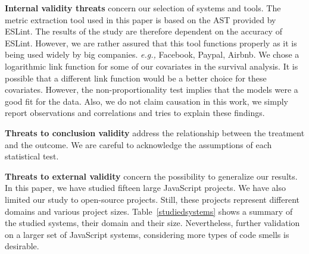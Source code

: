 \documentclass[smallcondensed]{svjour3}
\newcommand{\eg}{{\textit{e.g.,}}}
\newcommand{\New}[1]{\textcolor{red}{#1}}
\begin{document}

\textbf{Internal validity threats} concern our selection of systems and tools. %
The metric extraction tool used in this paper is based on the AST provided by ESLint. The results of the study are therefore dependent on the accuracy of ESLint. However, we are rather assured that this tool functions properly as it is being used widely by big companies. \eg{} Facebook, Paypal, Airbnb.
We chose a logarithmic link function for some of our covariates in the survival analysis. It is possible that a different link function would be a better choice for these covariates. However, the non-proportionality test implies that the models were a good fit for the data. %
Also, we do not claim causation in this work, we simply report observations and correlations and tries to explain these findings.

\textbf{Threats to conclusion validity} address the relationship between the treatment and the outcome. We are careful to acknowledge the assumptions of each statistical test.

\textbf{Threats to external validity} concern the possibility to generalize our results. In this paper, we have studied fifteen large JavaScript projects. We have also limited our study to open-source projects. Still, these projects represent different domains and various project sizes. Table~\ref{studiedsystems} shows a summary of the studied systems, their domain and their size. Nevertheless, further validation on a larger set of JavaScript systems, considering more types of code smells is desirable. %
\end{document}
